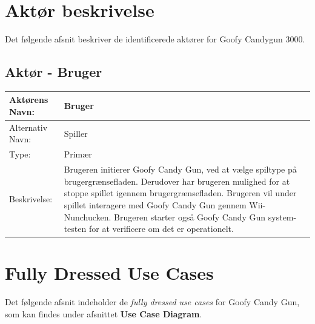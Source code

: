 \section{Aktør beskrivelse}
Det følgende afsnit beskriver de identificerede aktører for Goofy Candygun 3000.

\subsection{Aktør - Bruger}

\begin{tabularx}{\textwidth}{| p{2cm} | p{9.1cm} |}
	\hline
	Aktørens Navn: & Bruger \\ 
	\hline
	Alternativ Navn: & Spiller \\
	\hline
	Type: & Primær \\
	\hline
	Beskrivelse: & Brugeren initierer Goofy Candy Gun, ved at vælge spiltype på brugergrænsefladen. Derudover har brugeren mulighed for at stoppe spillet igennem brugergrænsefladen. Brugeren vil under spillet interagere med Goofy Candy Gun gennem Wii-Nunchucken. \newline
	Brugeren starter også Goofy Candy Gun system-testen for at verificere om det er operationelt. \\
	\hline
\end{tabularx}

\section{Fully Dressed Use Cases}

Det følgende afsnit indeholder de \textit{fully dressed use cases} for Goofy Candy Gun, som kan findes under afsnittet \textbf{Use Case Diagram}.

